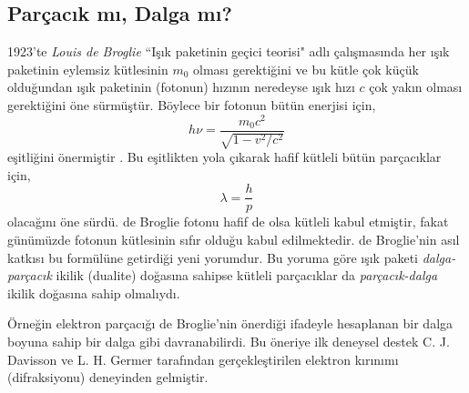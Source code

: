 \documentclass[a4paper,12pt, twoside]{article}
\begin{document}
\subsection{Parçacık mı, Dalga mı?}

1923'te {\it Louis de Broglie} ``Işık paketinin geçici teorisi" adlı çalışmasında her ışık paketinin eylemsiz kütlesinin $m_0$ olması gerektiğini ve
bu kütle çok küçük olduğundan ışık paketinin (fotonun) hızının neredeyse ışık hızı $c$ çok yakın olması gerektiğini öne sürmüştür. Böylece bir fotonun bütün enerjisi için,
\begin{equation}
\label{eq:foton_deBroglie_E}
h \nu = \frac{m_0 c^2}{\sqrt{1-v^2/c^2}}
\end{equation}
eşitliğini önermiştir \cite{book:FrenchAP}. Bu eşitlikten yola çıkarak hafif kütleli bütün parçacıklar için,
\begin{equation}
\label{eq:deBroglie_P}
\lambda = \frac{h}{p}
\end{equation}
olacağını öne sürdü. de Broglie fotonu hafif de olsa kütleli kabul etmiştir, fakat günümüzde fotonun kütlesinin sıfır olduğu kabul edilmektedir. de Broglie'nin asıl katkısı bu formülüne getirdiği yeni yorumdur. Bu yoruma göre ışık paketi {\it dalga-parçacık} ikilik (dualite) doğasına sahipse kütleli parçacıklar da {\it parçacık-dalga} ikilik doğasına sahip olmalıydı. 

Örneğin elektron parçacığı de Broglie'nin önerdiği ifadeyle hesaplanan bir dalga boyuna sahip bir dalga gibi davranabilirdi. Bu öneriye ilk deneysel destek C. J. Davisson ve L. H. Germer tarafından gerçekleştirilen elektron kırınımı (difraksiyonu) deneyinden gelmiştir. 
\end{document}
